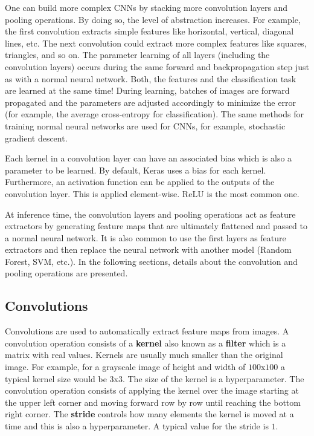 \documentclass[
  11pt,
]{krantz}
\makeatletter
\newenvironment{kframe}{%
\medskip{}
\setlength{\fboxsep}{.8em}
 \def\at@end@of@kframe{}%
 \ifinner\ifhmode%
  \def\at@end@of@kframe{\end{minipage}}%
  \begin{minipage}{\columnwidth}%
 \fi\fi%
 \def\FrameCommand##1{\hskip\@totalleftmargin \hskip-\fboxsep
 \colorbox{shadecolor}{##1}\hskip-\fboxsep
     \hskip-\linewidth \hskip-\@totalleftmargin \hskip\columnwidth}%
 \MakeFramed {\advance\hsize-\width
   \@totalleftmargin\z@ \linewidth\hsize
   \@setminipage}}%
 {\par\unskip\endMakeFramed%
 \at@end@of@kframe}
\newenvironment{rmdblock}[1]
  {
  \begin{itemize}
  \renewcommand{\labelitemi}{
    \raisebox{-.7\height}[0pt][0pt]{
      {\setkeys{Gin}{width=3em,keepaspectratio}\texttt{[image: images/icons/\#1]}}
    }
  }
  \setlength{\fboxsep}{1em}
  \begin{kframe}
  \item
  }
  {
  \end{kframe}
  \end{itemize}
  }
\newenvironment{rmdinfo}
  {\begin{rmdblock}{info}}
  {\end{rmdblock}}
\makeatother
\begin{document}
One can build more complex CNNs by stacking more convolution layers and pooling operations. By doing so, the level of abstraction increases. For example, the first convolution extracts simple features like horizontal, vertical, diagonal lines, etc. The next convolution could extract more complex features like squares, triangles, and so on. The parameter learning of all layers (including the convolution layers) occurs during the same forward and backpropagation step just as with a normal neural network. Both, the features and the classification task are learned at the same time! During learning, batches of images are forward propagated and the parameters are adjusted accordingly to minimize the error (for example, the average cross-entropy for classification). The same methods for training normal neural networks are used for CNNs, for example, stochastic gradient descent.

\begin{rmdinfo}
Each kernel in a convolution layer can have an associated bias which is also a parameter to be learned. By default, Keras uses a bias for each kernel. Furthermore, an activation function can be applied to the outputs of the convolution layer. This is applied element-wise. ReLU is the most common one.
\end{rmdinfo}

At inference time, the convolution layers and pooling operations act as feature extractors by generating feature maps that are ultimately flattened and passed to a normal neural network. It is also common to use the first layers as feature extractors and then replace the neural network with another model (Random Forest, SVM, etc.). In the following sections, details about the convolution and pooling operations are presented.

\hypertarget{convolutions}{%
\subsection{Convolutions}\label{convolutions}}

Convolutions are used to automatically extract feature maps from images. A convolution operation consists of a \textbf{kernel} also known as a \textbf{filter} which is a matrix with real values. Kernels are usually much smaller than the original image. For example, for a grayscale image of height and width of \(100\)x\(100\) a typical kernel size would be \(3\)x\(3\). The size of the kernel is a hyperparameter. The convolution operation consists of applying the kernel over the image starting at the upper left corner and moving forward row by row until reaching the bottom right corner. The \textbf{stride} controls how many elements the kernel is moved at a time and this is also a hyperparameter. A typical value for the stride is \(1\).
\end{document}

